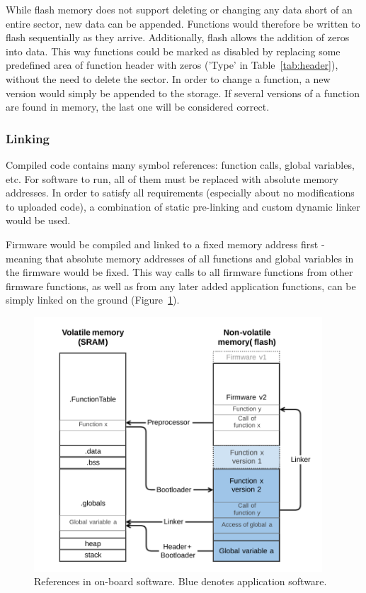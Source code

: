 While flash memory does not support deleting or changing any data short of an entire sector, new data can be appended. Functions would therefore be written to flash sequentially as they arrive. Additionally, flash allows the addition of zeros into data. This way functions could be marked as disabled by replacing some predefined area of function header with zeros ('Type' in Table~\ref{tab:header}), without the need to delete the sector. In order to change a function, a new version would simply be appended to the storage. If several versions of a function are found in memory, the last one will be considered correct.

\subsubsection{Linking}

Compiled code contains many symbol references: function calls, global variables, etc. For software to run, all of them must be replaced with absolute memory addresses. In order to satisfy all requirements (especially about no modifications to uploaded code), a combination of static pre-linking and custom dynamic linker would be used.

Firmware would be compiled and linked to a fixed memory address first - meaning that absolute memory addresses of all functions and global variables in the firmware would be fixed. This way calls to all firmware functions from other firmware functions, as well as from any later added application functions, can be simply linked on the ground (Figure~\ref{fig:swLink}).

\begin{figure}[ht]
	\centering
	\includegraphics[width=0.96\textwidth]{figures/Software_linking.pdf}
	\caption{References in on-board software. Blue denotes application software.}
	\label{fig:swLink}
\end{figure}

